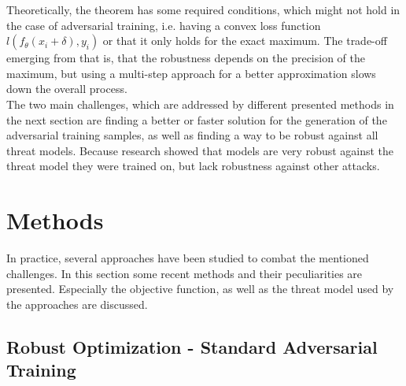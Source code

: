 \documentclass{article}
\begin{document}
Theoretically, the theorem has some required conditions, which might not hold in the case of adversarial training, i.e. having a convex loss function $l(f_{\theta}(x_i + \delta), y_i)$ or that it only holds for the exact maximum. The trade-off emerging from that is, that the robustness depends on the precision of the maximum, but using a multi-step approach for a better approximation slows down the overall process. \\
The two main challenges, which are addressed by different presented methods in the next section are finding a better or faster solution for the generation of the adversarial training samples, as well as finding a way to be robust against all threat models. Because research showed that models are very robust against the threat model they were trained on, but lack robustness against other attacks.
  
\section{Methods}
  
In practice, several approaches have been studied to combat the mentioned challenges. In this section some recent methods and their peculiarities are presented. Especially the objective function, as well as the threat model used by the approaches are discussed.
  
\subsection{Robust Optimization - Standard Adversarial Training} \label{Robust Opti}
  
\end{document}
